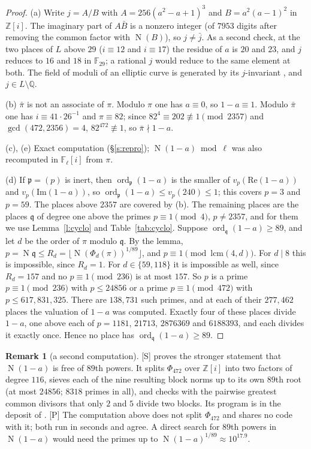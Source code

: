 \documentclass[11pt,a4paper]{article}
\newcommand{\Z}{\mathbb{Z}}
\newcommand{\Q}{\mathbb{Q}}
\newcommand{\F}{\mathbb{F}}
\newcommand{\ord}{\operatorname{ord}}
\newcommand{\Nm}{\operatorname{N}}
\newcommand{\tS}{\textup{[S]}}
\newcommand{\tP}{\textup{[P]}}
\theoremstyle{plain}
\theoremstyle{definition}
\newtheorem{remark}[theorem]{Remark}
\begin{document}
\begin{proof}
(a) Write $j=A/B$ with $A=256(a^2-a+1)^3$ and $B=a^2(a-1)^2$ in $\Z[i]$. The imaginary part of $A\bar B$ is a nonzero
integer (of $7953$ digits after removing the common factor with $\Nm(B)$), so $j\ne\bar j$. As a second check, at the
two places of $L$ above $29$ ($i\equiv12$ and $i\equiv17$) the residue of $a$ is $20$ and $23$, and $j$ reduces to $16$
and $18$ in $\F_{29}$; a rational $j$ would reduce to the same element at both. The field of moduli of an elliptic
curve is generated by its $j$-invariant \cite[Prop.~1.8(ii)]{IUT4}, and $j\in L\setminus\Q$.

(b) $\bar\pi$ is not an associate of $\pi$. Modulo $\pi$ one has $a\equiv0$, so $1-a\equiv1$. Modulo $\bar\pi$ one has
$i\equiv41\cdot26^{-1}$ and $\pi\equiv82$; since $82^4\equiv202\not\equiv1\pmod{2357}$ and $\gcd(472,2356)=4$,
$82^{472}\not\equiv1$, so $\bar\pi\nmid1-a$.

(c), (e) Exact computation (\S\ref{s:repro}); $\Nm(1-a)\bmod\ell$ was also recomputed in $\F_\ell[i]$ from $\pi$.

(d) If $\mathfrak p=(p)$ is inert, then $\ord_{\mathfrak p}(1-a)$ is the smaller of $v_p(\mathrm{Re}(1-a))$ and
$v_p(\mathrm{Im}(1-a))$, so $\ord_{\mathfrak p}(1-a)\le v_p(240)\le1$; this covers $p=3$ and $p=59$. The places above $2357$ are covered by (b). The remaining places are
the places $\mathfrak q$ of degree one above the primes $p\equiv1\pmod4$, $p\ne2357$, and for them we use
Lemma~\ref{l:cyclo} and Table~\ref{tab:cyclo}. Suppose $\ord_{\mathfrak q}(1-a)\ge89$, and let $d$ be the order of
$\pi$ modulo $\mathfrak q$. By the lemma, $p=\Nm\mathfrak q\le R_d=\lfloor\Nm(\Phi_d(\pi))^{1/89}\rfloor$, and
$p\equiv1\pmod{\mathrm{lcm}(4,d)}$. For $d\mid8$ this is impossible, since $R_d=1$. For $d\in\{59,118\}$ it is
impossible as well, since $R_d=157$ and no $p\equiv1\pmod{236}$ is at most $157$. So $p$ is a prime $p\equiv1\pmod{236}$
with $p\le24856$ or a prime $p\equiv1\pmod{472}$ with $p\le617{,}831{,}325$. There are $138{,}731$ such primes, and at
each of their $277{,}462$ places the valuation of $1-a$ was computed. Exactly four of these places divide $1-a$, one
above each of $p=1181$, $21713$, $2876369$ and $6188393$, and each divides it exactly once. Hence no place has
$\ord_{\mathfrak q}(1-a)\ge89$.
\end{proof}

\begin{remark}[a second computation]\label{r:second}
\tS{} \cite[\S13]{Second} proves the stronger statement that $\Nm(1-a)$ is free of $89$th powers. It splits
$\Phi_{472}$ over $\Z[i]$ into two factors of degree $116$, sieves each of the nine resulting block norms up to its own
$89$th root (at most $24856$; $8318$ primes in all), and checks with the pairwise greatest common divisors that only
$2$ and $5$ divide two blocks. Its program is in the deposit of \cite{Second}. \tP{} The computation above does not split
$\Phi_{472}$ and shares no code with it; both run in seconds and agree. A direct search for $89$th powers in
$\Nm(1-a)$ would need the primes up to $\Nm(1-a)^{1/89}\approx10^{17.9}$.
\end{remark}
\end{document}
